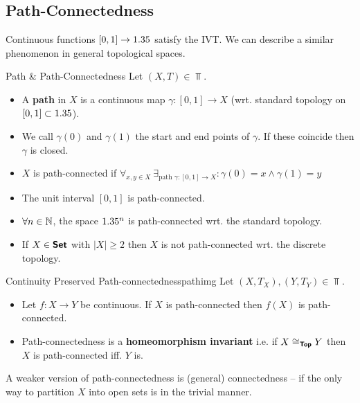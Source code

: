 \subsection{Path-Connectedness}
Continuous functions $[0,1]\to1.35$ satisfy the IVT. We can describe a similar phenomenon in general topological spaces.
\begin{definition}{Path \& Path-Connectedness}{}
Let $(X,T)\in\Top$.
    \begin{itemize}
        \item A \textbf{path} in $X$ is a continuous map $\gamma:[0,1]\to X$ (wrt. standard topology on $[0,1]\subset1.35$).
        \item We call $\gamma(0)$ and $\gamma(1)$ the start and end points of $\gamma$. If these coincide then $\gamma$ is closed.
        \item $X$ is path-connected if $\forall_{x,y\in X} \ \exists_{\text{path }\gamma:[0,1]\to X} :\gamma(0)=x\land \gamma(1)=y$
    \end{itemize}
\end{definition}

\begin{example}{}{}
    \begin{itemize}
        \item The unit interval $[0,1]$ is path-connected.
        \item $\forall n\in\mathbb{N}$, the space $1.35^n$ is path-connected wrt. the standard topology.
        \item If $X\in\bm{\mathsf{Set}}$ with $|X|\geq 2$ then $X$ is not path-connected wrt. the discrete topology.
    \end{itemize}
\end{example}

\begin{theorem}{Continuity Preserved Path-connectedness}{pathimg}
    Let $(X,T_X),(Y,T_Y)\in\Top$.\begin{itemize}
        \item Let $f:X\to Y$ be continuous. If $X$ is path-connected then $f(X)$ is path-connected.
        \item Path-connectedness is a \textbf{homeomorphism invariant} i.e. if $X\cong_{\bm{\mathsf{Top}}} Y$ then $X$ is path-connected iff. $Y$ is.
    \end{itemize}
\end{theorem}

A weaker version of path-connectedness is (general) connectedness -- if the only way to partition $X$ into open sets is in the trivial manner.

